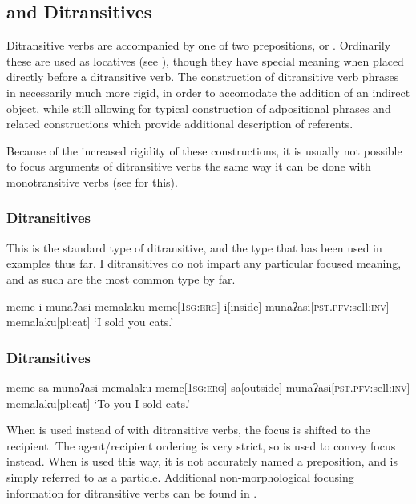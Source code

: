 \subsection{ and  Ditransitives}\label{sec:i_sa_ditrans}
Ditransitive verbs are accompanied by one of two prepositions,  or . Ordinarily these are used as locatives (see ), though they have special meaning when placed directly before a ditransitive verb. The construction of ditransitive verb phrases in necessarily much more rigid, in order to accomodate the addition of an indirect object, while still allowing for typical construction of adpositional phrases and related constructions which provide additional description of referents.

Because of the increased rigidity of these constructions, it is usually not possible to focus arguments of ditransitive verbs the same way it can be done with monotransitive verbs (see  for this).

\subsubsection{ Ditransitives}

This is the standard type of ditransitive, and the type that has been used in examples thus far. I ditransitives do not impart any particular focused meaning, and as such are the most common type by far.

\ex
\begingl
\glpreamble meme i munaʔasi memalaku
\endpreamble
meme[\textsc{1sg:erg}]
i[inside]
munaʔasi[\textsc{pst.pfv:}sell\textsc{:inv}]
memalaku[pl:cat]
\glft `I sold you cats.'
\endgl
\xe


\subsubsection{ Ditransitives}

\ex
\begingl
\glpreamble meme sa munaʔasi memalaku
\endpreamble
meme[\textsc{1sg:erg}]
sa[outside]
munaʔasi[\textsc{pst.pfv:}sell\textsc{:inv}]
memalaku[pl:cat]
\glft `To you I sold cats.'\footnotemark
\endgl
\xe


When  is used instead of  with ditransitive verbs, the focus is shifted to the recipient. The agent/recipient ordering is very strict, so  is used to convey focus instead. When  is used this way, it is not accurately named a preposition, and is simply referred to as a particle. Additional non-morphological focusing information for ditransitive verbs can be found in .

